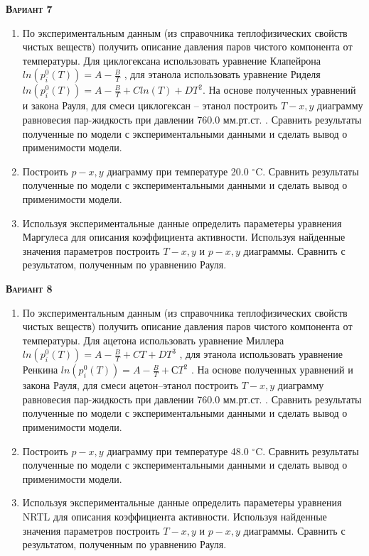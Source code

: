 \textsc{\textbf{Вариант 7}}
\begin{enumerate}
\item По экспериментальным данным (из справочника теплофизических свойств чистых веществ) получить описание давления паров чистого компонента от температуры. Для циклогексана использовать уравнение Клапейрона $ln(p_i^0(T))=A-\frac{B}{T}$     , для этанола использовать уравнение Риделя $ln(p_i^0(T))=A-\frac{B}{T}+C ln(T)+DT^2$. На основе полученных уравнений и закона Рауля, для смеси циклогексан -- этанол построить $T-x,y$ диаграмму равновесия пар-жидкость при давлении  760.0 мм.рт.ст. . Сравнить результаты полученные по модели с экспериментальными данными и сделать вывод о применимости модели.

\item Построить $p-x,y$ диаграмму при температуре   20.0 $^\circ$C. Сравнить результаты полученные по модели с экспериментальными данными и сделать вывод о применимости модели. \item Используя экспериментальные данные определить параметеры уравнения Маргулеса   для описания коэффициента активности. Используя найденные значения параметров построить $T-x,y$ и $p-x,y$ диаграммы. Сравнить с результатом, полученным по уравнению Рауля.\end{enumerate}

\textsc{\textbf{Вариант 8}}
\begin{enumerate}
\item По экспериментальным данным (из справочника теплофизических свойств чистых веществ) получить описание давления паров чистого компонента от температуры. Для ацетона использовать уравнение Миллера $ln(p_i^0(T))=A-\frac{B}{T}+C T+DT^3$  , для этанола использовать уравнение Ренкина $ln(p_i^0(T))=A-\frac{B}{T}+СT^2$     . На основе полученных уравнений и закона Рауля, для смеси ацетон--этанол построить $T-x,y$ диаграмму равновесия пар-жидкость при давлении  760.0 мм.рт.ст. . Сравнить результаты полученные по модели с экспериментальными данными и сделать вывод о применимости модели.

\item Построить $p-x,y$ диаграмму при температуре   48.0 $^\circ$C. Сравнить результаты полученные по модели с экспериментальными данными и сделать вывод о применимости модели. \item Используя экспериментальные данные определить параметеры уравнения NRTL                 для описания коэффициента активности. Используя найденные значения параметров построить $T-x,y$ и $p-x,y$ диаграммы. Сравнить с результатом, полученным по уравнению Рауля.\end{enumerate}

